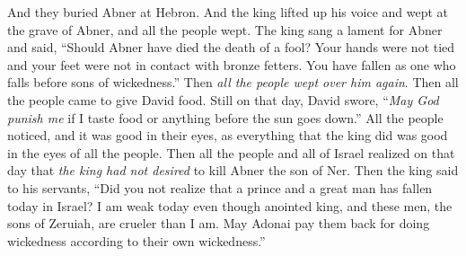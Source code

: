 \begin{biblechapter}
\verse And they buried Abner at Hebron. And the king lifted up his voice and wept at the grave of Abner, and all the people wept.
\verse The king sang a lament for Abner and said, “Should Abner have died the death of a fool?
\verse Your hands were not tied and your feet were not in contact with bronze fetters. You have fallen as one who falls before sons of wickedness.” Then \textit{all the people wept over him again}.
\verse Then all the people came to give David food. Still on that day, David swore, “\textit{May God punish me} if I taste food or anything before the sun goes down.”
\verse All the people noticed, and it was good in their eyes, as everything that the king did was good in the eyes of all the people.
\verse Then all the people and all of Israel realized on that day that \textit{the king had not desired} to kill Abner the son of Ner.
\verse Then the king said to his servants, “Did you not realize that a prince and a great man has fallen today in Israel?
\verse I am weak today even though anointed king, and these men, the sons of Zeruiah, are crueler than I am. May Adonai pay them back for doing wickedness according to their own wickedness.”
\end{biblechapter}

